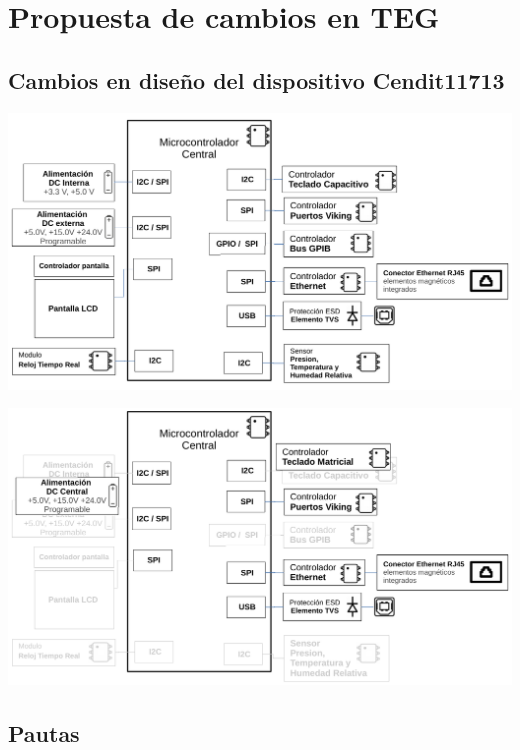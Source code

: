 \documentclass[paper=letter,oneside,fontsize=12pt, parskip=full]{article}
\begin{document}
	
	\section{Propuesta de cambios en TEG}
	
	\subsection{Cambios en diseño del dispositivo Cendit11713}
	
		\begin{center}
			\includegraphics[width=16cm]{Cendit11713BloquesAntes.pdf} \\
		\end{center}

		\begin{center}
			\includegraphics[width=16cm]{Cendit11713BloquesDespues.pdf}
		\end{center}	
	
	\subsection{Pautas}
	
\end{document}
